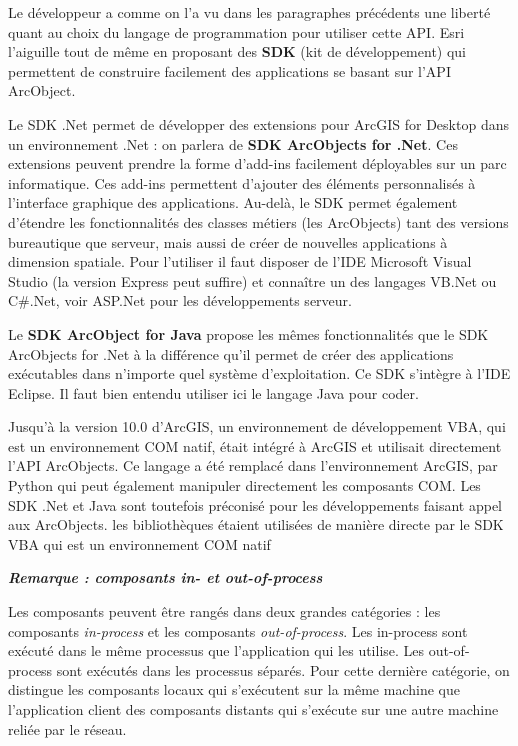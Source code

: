 \documentclass[11pt]{article}
\begin{document}
Le développeur a comme on l'a vu dans les paragraphes précédents une liberté quant au choix du langage de programmation pour utiliser cette API. Esri l'aiguille tout de même en proposant des \textbf{SDK} (kit de développement) qui permettent de construire facilement des applications se basant sur l'API ArcObject.

Le SDK .Net permet de développer des extensions pour ArcGIS for Desktop dans un environnement .Net : on parlera de \textbf{SDK ArcObjects for .Net}. Ces extensions peuvent prendre la forme d’add-ins facilement déployables sur un parc informatique. Ces add-ins permettent d’ajouter des éléments personnalisés à l’interface graphique des applications. Au-delà, le SDK permet également d’étendre les fonctionnalités des classes métiers (les ArcObjects) tant des versions bureautique que serveur, mais aussi de créer de nouvelles applications à dimension spatiale. Pour l’utiliser il faut disposer de l’IDE Microsoft Visual Studio (la version Express peut suffire) et connaître un des langages VB.Net ou C\#.Net, voir ASP.Net pour les développements serveur.

Le \textbf{SDK ArcObject for Java} propose les mêmes fonctionnalités que le SDK ArcObjects for .Net à la différence qu’il permet de créer des applications exécutables dans n’importe quel système d’exploitation. Ce SDK s’intègre à l’IDE Eclipse. Il faut bien entendu utiliser ici le langage Java pour coder.

Jusqu'à la version 10.0 d'ArcGIS, un environnement de développement VBA, qui est un environnement COM natif, était intégré à ArcGIS et utilisait directement l'API ArcObjects. Ce langage a été remplacé dans l'environnement ArcGIS, par Python qui peut également manipuler directement les composants COM. Les SDK .Net et Java sont toutefois préconisé pour les développements faisant appel aux ArcObjects. 
les bibliothèques étaient utilisées de manière directe par le SDK VBA qui est un environnement COM natif

\textbf{\emph{Remarque : composants in- et out-of-process}}

Les composants peuvent être rangés dans deux grandes catégories : les composants \textit{in-process} et les composants \textit{out-of-process}. Les in-process sont exécuté dans le même processus que l'application qui les utilise. Les out-of-process sont exécutés dans les processus séparés. Pour cette dernière catégorie, on distingue les composants locaux qui s’exécutent sur la même machine que l'application client des composants distants qui s'exécute sur une autre machine reliée par le réseau.
\end{document}
